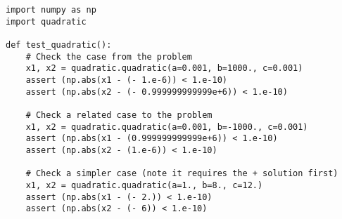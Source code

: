\documentclass[11pt, preprint]{aastex}
\begin{document}
\begin{enumerate}
\begin{verbatim}
import numpy as np
import quadratic

def test_quadratic():
    # Check the case from the problem
    x1, x2 = quadratic.quadratic(a=0.001, b=1000., c=0.001)
    assert (np.abs(x1 - (- 1.e-6)) < 1.e-10)
    assert (np.abs(x2 - (- 0.999999999999e+6)) < 1.e-10)

    # Check a related case to the problem
    x1, x2 = quadratic.quadratic(a=0.001, b=-1000., c=0.001)
    assert (np.abs(x1 - (0.999999999999e+6)) < 1.e-10)
    assert (np.abs(x2 - (1.e-6)) < 1.e-10)

    # Check a simpler case (note it requires the + solution first)
    x1, x2 = quadratic.quadratic(a=1., b=8., c=12.)
    assert (np.abs(x1 - (- 2.)) < 1.e-10)
    assert (np.abs(x2 - (- 6)) < 1.e-10)
\end{verbatim}

\end{enumerate}
\end{document}
